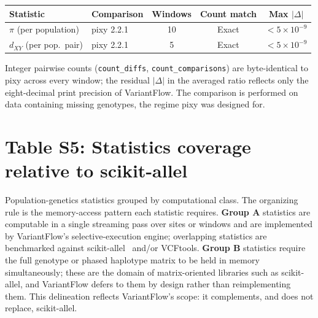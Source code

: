 \documentclass[11pt]{article}
\begin{document}
\begin{table}[ht]
\centering
\small
\begin{tabularx}{\linewidth}{lXccc}
\toprule
Statistic & Comparison & Windows & Count match & Max $|\Delta|$ \\
\midrule
$\pi$ (per population)   & pixy 2.2.1 & 10 & Exact & $<5\times10^{-9}$ \\
$d_{XY}$ (per pop.\ pair) & pixy 2.2.1 &  5 & Exact & $<5\times10^{-9}$ \\
\bottomrule
\end{tabularx}
\vspace{4pt}

\footnotesize{Integer pairwise counts (\texttt{count\_diffs},
\texttt{count\_comparisons}) are byte-identical to pixy across every window;
the residual $|\Delta|$ in the averaged ratio reflects only the eight-decimal
print precision of VariantFlow. The comparison is performed on data
containing missing genotypes, the regime pixy was designed for.}
\end{table}

\newpage
\section*{Table S5: Statistics coverage relative to scikit-allel}

Population-genetics statistics grouped by computational class. The organizing
rule is the memory-access pattern each statistic requires. \textbf{Group A}
statistics are computable in a single streaming pass over sites or windows and
are implemented by VariantFlow's selective-execution engine; overlapping
statistics are benchmarked against scikit-allel~\citep{scikitallel} and/or
VCFtools. \textbf{Group B} statistics require the full genotype or phased
haplotype matrix to be held in memory simultaneously; these are the domain of
matrix-oriented libraries such as scikit-allel, and VariantFlow defers to them
by design rather than reimplementing them. This delineation reflects
VariantFlow's scope: it complements, and does not replace, scikit-allel.
\end{document}
